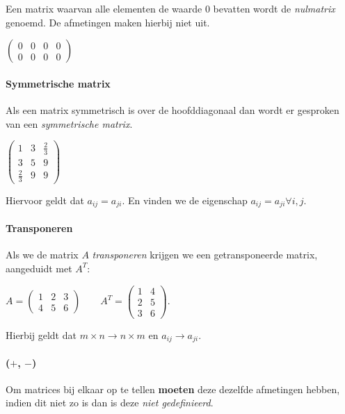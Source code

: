 \documentclass[11pt]{article}
\begin{document}
    Een matrix waarvan alle elementen de waarde \(0\) bevatten wordt de
\emph{nulmatrix} genoemd. De afmetingen maken hierbij niet uit.

\(\begin{pmatrix}0 & 0 & 0 & 0 \\ 0 & 0 & 0 & 0\end{pmatrix}\)

    \hypertarget{symmetrische-matrix}{%
\paragraph{Symmetrische matrix}\label{symmetrische-matrix}}

    Als een matrix symmetrisch is over de hoofddiagonaal dan wordt er
gesproken van een \emph{symmetrische matrix}.

\(\begin{pmatrix}1 & 3 & \frac{2}{3} \\ 3 & 5 & 9 \\ \frac{2}{3} & 9 & 9 \end{pmatrix}\)

Hiervoor geldt dat \(a_{ij} = a_{ji}\). En vinden we de eigenschap
\(a_{ij} = a_{ji} \forall i,j\).

    \hypertarget{transponeren}{%
\paragraph{Transponeren}\label{transponeren}}

    Als we de matrix \(A\) \emph{transponeren} krijgen we een
getransponeerde matrix, aangeduidt met \(A^T\):

\(A = \begin{pmatrix} 1 & 2 & 3 \\ 4 & 5 & 6 \end{pmatrix} \qquad A^T = \begin{pmatrix} 1 & 4 \\ 2 & 5 \\ 3 & 6 \end{pmatrix}\).

Hierbij geldt dat \(m \times n \rightarrow n \times m\) en
\(a_{ij} \rightarrow a_{ji}\).

    \hypertarget{section}{%
\paragraph{\texorpdfstring{(\(+\), \(-\))}{(+, -)}}\label{section}}

    Om matrices bij elkaar op te tellen \textbf{moeten} deze dezelfde
afmetingen hebben, indien dit niet zo is dan is deze \emph{niet
gedefinieerd}.
\end{document}
